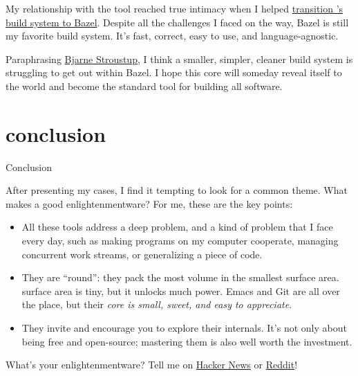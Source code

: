 \documentclass{article}
\begin{document}
My relationship with the tool reached true intimacy when I helped \href{/posts/17-scaling-rust-builds-with-bazel.html}{transition 's build system to Bazel}.
Despite all the challenges I faced on the way, Bazel is still my favorite build system.
It's fast, correct, easy to use, and language-agnostic.

Paraphrasing \href{https://www.stroustrup.com/quotes.html}{Bjarne Stroustup}, I think a smaller, simpler, cleaner build system is struggling to get out within Bazel.
I hope this core will someday reveal itself to the world and become the standard tool for building all software.

\section{conclusion}{Conclusion}

After presenting my cases, I find it tempting to look for a common theme.
What makes a good enlightenmentware?
For me, these are the key points:

\begin{itemize}
  \item
  All these tools address a deep problem, and a kind of problem that I face every day, such as making programs on my computer cooperate, managing concurrent work streams, or generalizing a piece of code.
  \item
  They are ``round'': they pack the most volume in the smallest surface area.
   surface area is tiny, but it unlocks much power.
  Emacs and Git are all over the place, but their \em{core} is small, sweet, and easy to appreciate.
  \item
  They invite and encourage you to explore their internals.
  It's not only about being free and open-source; mastering them is also well worth the investment.
\end{itemize}

What's your enlightenmentware? Tell me on \href{https://news.ycombinator.com/item?id=40417447}{Hacker News} or \href{https://www.reddit.com/r/programming/comments/1cwa1m8/blog_post_enlightenmentware/}{Reddit}!
\end{document}
